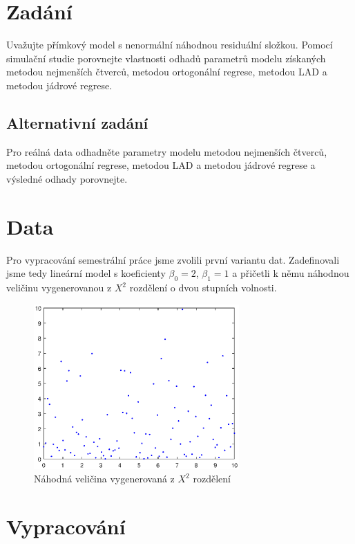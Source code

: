 \section{Zadání}

Uvažujte přímkový model s nenormální náhodnou residuální složkou.
Pomocí simulační studie porovnejte vlastnosti odhadů parametrů modelu získaných metodou nejmenších čtverců, metodou ortogonální regrese, metodou LAD a metodou jádrové regrese.

\subsection{Alternativní zadání}

Pro reálná data odhadněte parametry modelu metodou nejmenších čtverců, metodou ortogonální regrese, metodou LAD a metodou jádrové regrese a výsledné odhady porovnejte.

\section{Data}

Pro vypracování semestrální práce jsme zvolili první variantu dat.
Zadefinovali jsme tedy lineární model s koeficienty \( \beta_0 = 2 \), \( \beta_1 = 1 \) a přičetli k němu náhodnou veličinu vygenerovanou z \( X^2 \) rozdělení o dvou stupních volnosti.

\begin{figure}[htb]
    \centering
    \includegraphics[width=0.7\textwidth]{graphs/fig3.eps}
    \caption{Náhodná veličina vygenerovaná z \( X^2 \) rozdělení}
    \label{fig:lr3}
\end{figure}
\FloatBarrier

\section{Vypracování}

